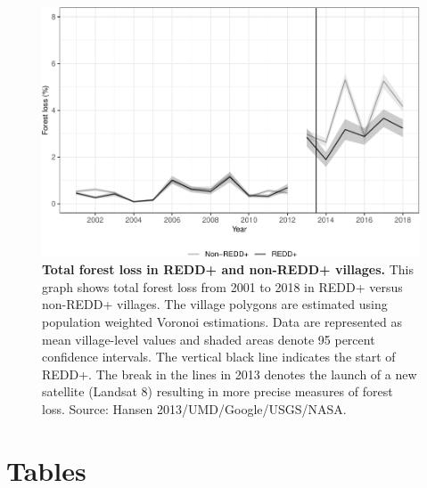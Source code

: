 \documentclass[
]{article}
\begin{document}
\begin{figure}[H]

{\centering \includegraphics[width=0.9\linewidth]{paper_REDD_replication_files/figure-latex/figForestlossResults-1} 

}

\caption{\textbf{Total forest loss in REDD+ and non-REDD+ villages.} This graph shows total forest loss from 2001 to 2018 in REDD+ versus non-REDD+ villages. The village polygons are estimated using population weighted Voronoi estimations. Data are represented as mean village-level values and shaded areas denote 95 percent confidence intervals. The vertical black line indicates the start of REDD+. The break in the lines in 2013 denotes the launch of a new satellite (Landsat 8) resulting in more precise measures of forest loss. Source: Hansen 2013/UMD/Google/USGS/NASA.}\label{fig:figForestlossResults}
\end{figure}

\newpage

\hypertarget{tables}{%
\section*{Tables}\label{tables}}
\end{document}
